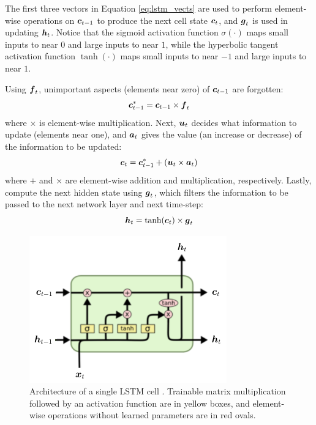 The first three vectors in Equation \ref{eq:lstm_vects} are used to perform element-wise operations on $\boldsymbol{c}_{t-1}$ to produce the next cell state $\boldsymbol{c}_t$, and $\boldsymbol{g}_t$ is used in updating $\boldsymbol{h}_t$. Notice that the sigmoid activation function $\sigma(\cdot)$ maps small inputs to near $0$ and large inputs to near $1$, while the hyperbolic tangent activation function $\tanh(\cdot)$ maps small inputs to near $-1$ and large inputs to near $1$. 

Using $\boldsymbol{f}_t$, unimportant aspects (elements near zero) of $\boldsymbol{c}_{t-1}$ are forgotten:
\begin{equation}
  \boldsymbol{c}_{t-1}^* = \boldsymbol{c}_{t-1} \times \boldsymbol{f}_t
  \label{eq:lstm_forget}
\end{equation}
where $\times$ is element-wise multiplication. Next, $\boldsymbol{u}_t$ decides what information to update (elements near one), and $\boldsymbol{a}_t$ gives the value (an increase or decrease) of the information to be updated:
\begin{equation}
  \boldsymbol{c}_t = \boldsymbol{c}_{t-1}^* + \left( \boldsymbol{u}_t \times \boldsymbol{a}_t \right)
  \label{eq:lstm_update}
\end{equation}
where $+$ and $\times$ are element-wise addition and multiplication, respectively. Lastly, compute the next hidden state using $\boldsymbol{g}_t$, which filters the information to be passed to the next network layer and next time-step:
\begin{equation}
  \boldsymbol{h}_t = \tanh(\boldsymbol{c}_t) \times \boldsymbol{g}_t
  \label{eq:lstm_filter}
\end{equation}

\begin{figure}[h]
  \centering
  \includegraphics[width=.5\textwidth]{img/lstm_visual}
  \caption{Architecture of a single LSTM cell \cite{olah2015}. Trainable matrix multiplication followed by an activation function are in yellow boxes, and element-wise operations without learned parameters are in red ovals.}
  \label{fig:lstm_visual}
\end{figure}

